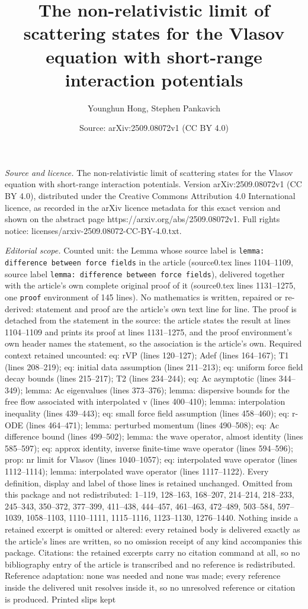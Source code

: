 \documentclass[10pt,a4paper]{amsart}
\title[The non-relativistic limit of scattering states for the Vlas]{The non-relativistic limit of scattering states for the Vlasov equation with short-range interaction potentials}
\author{Younghun Hong, Stephen Pankavich}
\date{Source: arXiv:2509.08072v1 (CC BY 4.0)}
\begin{document}
\maketitle

\noindent\emph{Source and licence.} The non-relativistic limit of scattering states for the Vlasov equation with short-range interaction potentials. Version arXiv:2509.08072v1 (CC BY 4.0), distributed under the Creative Commons Attribution 4.0 International licence, as recorded in the arXiv licence metadata for this exact version and shown on the abstract page https://arxiv.org/abs/2509.08072v1. Full rights notice: licenses/arxiv-2509.08072-CC-BY-4.0.txt.\par\smallskip

\noindent\textit{Editorial scope.} Counted unit: the Lemma whose source label is \texttt{lemma: difference between force fields} in the article (source0.tex lines 1104--1109, source label \texttt{lemma: difference between force fields}), delivered together with the article's own complete original proof of it (source0.tex lines 1131--1275, one \texttt{proof} environment of 145 lines). No mathematics is written, repaired or re-derived: statement and proof are the article's own text line for line. The proof is detached from the statement in the source: the article states the result at lines 1104--1109 and prints its proof at lines 1131--1275, and the proof environment's own header names the statement, so the association is the article's own. Required context retained uncounted: eq: rVP (lines 120--127); Adef (lines 164--167); T1 (lines 208--219); eq: initial data assumption (lines 211--213); eq: uniform force field decay bounds (lines 215--217); T2 (lines 234--244); eq: Ac asymptotic (lines 344--349); lemma: Ac eigenvalues (lines 373--376); lemma: dispersive bounds for the free flow associated with interpolated v (lines 400--410); lemma: interpolation inequality (lines 439--443); eq: small force field assumption (lines 458--460); eq: r-ODE (lines 464--471); lemma: perturbed momentum (lines 490--508); eq: Ac difference bound (lines 499--502); lemma:  the wave operator, almost identity (lines 585--597); eq: approx identity, inverse finite-time wave operator (lines 594--596); prop: nr limit for Vlasov (lines 1040--1057); eq: interpolated wave operator (lines 1112--1114); lemma: interpolated wave operator (lines 1117--1122). Every definition, display and label of those lines is retained unchanged. Omitted from this package and not redistributed: 1--119, 128--163, 168--207, 214--214, 218--233, 245--343, 350--372, 377--399, 411--438, 444--457, 461--463, 472--489, 503--584, 597--1039, 1058--1103, 1110--1111, 1115--1116, 1123--1130, 1276--1440. Nothing inside a retained excerpt is omitted or altered: every retained body is delivered exactly as the article's lines are written, so no omission receipt of any kind accompanies this package. Citations: the retained excerpts carry no citation command at all, so no bibliography entry of the article is transcribed and no reference is redistributed. Reference adaptation: none was needed and none was made; every reference inside the delivered unit resolves inside it, so no unresolved reference or citation is produced. Printed slips kept 
\end{document}
